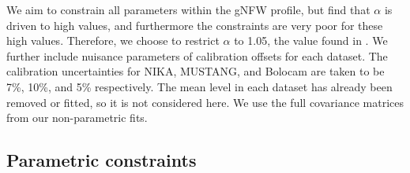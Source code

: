 \documentclass[onecolumn,traditabstract]{aa}
\begin{document}
We aim to constrain all parameters within the gNFW profile, but find that $\alpha$ is driven to high values, and
furthermore the constraints are very poor for these high values. Therefore, we choose to restrict $\alpha$ to 1.05,
the value found in . We further include nuisance parameters of calibration offsets for each dataset.
The calibration uncertainties for NIKA, MUSTANG, and Bolocam are taken to be 7\%, 10\%, and 5\% respectively.
The mean level in each dataset has already been removed or fitted, so it is not considered here. We use the full
covariance matrices from our non-parametric fits.


\subsection{Parametric constraints}
\label{sec:parametric}
\end{document}
